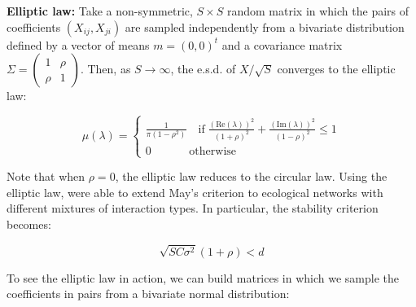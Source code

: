 \documentclass[
]{book}
\begin{document}
\textbf{Elliptic law:} Take a non-symmetric, \(S \times S\) random matrix in which the pairs of coefficients \((X_{ij}, X_{ji})\) are sampled independently from a bivariate distribution defined by a vector of means \(m = (0,0)^t\) and a covariance matrix \(\Sigma = \begin{pmatrix} 1 & \rho\\ \rho & 1 \end{pmatrix}\). Then, as \(S \to \infty\), the e.s.d. of \({X} / \sqrt{S}\) converges to the elliptic law:

\[
  \mu(\lambda) = \begin{cases} \frac{1}{\pi (1 - \rho^2) } \quad
    \text{if} \; \frac{(\text{Re}(\lambda))^2}{(1 + \rho)^2} +
    \frac{(\text{Im}(\lambda))^2}{(1 -\rho)^2} \leq
    1\\ 0 \quad \quad \quad \text{ otherwise}
  \end{cases}
\]

Note that when \(\rho = 0\), the elliptic law reduces to the circular law. Using the elliptic law, \citet{allesina2012stability} were able to extend May's criterion to ecological networks with different mixtures of interaction types. In particular, the stability criterion becomes:

\[
\sqrt{S C \sigma^2}(1 + \rho) < d
\]

To see the elliptic law in action, we can build matrices in which we sample the coefficients in pairs from a bivariate normal distribution:
\end{document}
